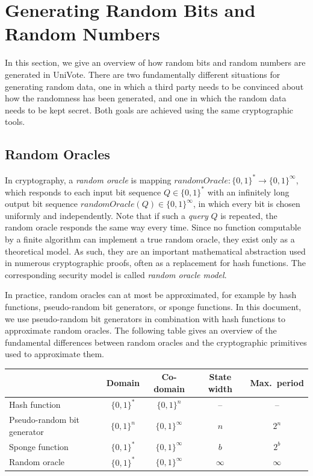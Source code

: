 \documentclass[bibtotoc,halfparskip,oneside]{scrreprt}
\begin{document}
	\section{Generating Random Bits and Random Numbers} 
	
	In this section, we give an overview of how random bits and random numbers are generated in UniVote. There are two fundamentally different situations for generating random data, one in which a third party needs to be convinced about how the randomness has been generated, and one in which the random data needs to be kept secret. Both goals are achieved using the same cryptographic tools.
	
	\subsection{Random Oracles}
	
	In cryptography, a \emph{random oracle} is mapping $\mathit{randomOracle}:\{0,1\}^*\rightarrow \{0,1\}^\infty$, which responds to each input bit sequence $Q\in \{0,1\}^*$ with an infinitely long  output bit sequence $\mathit{randomOracle}(Q)\in\{0,1\}^{\infty}$, in which every bit is chosen uniformly and independently. Note that if such a \emph{query} $Q$ is repeated, the random oracle responds the same way every time. Since no function computable by a finite algorithm can implement a true random oracle, they exist only as a theoretical model. As such, they are an important mathematical abstraction used in numerous cryptographic proofs, often as a replacement for hash functions. The corresponding security model is called \emph{random oracle model}.
	
	In practice, random oracles can at most be approximated, for example by hash functions, pseudo-random bit generators, or sponge functions. In this document, we use pseudo-random bit generators in combination with hash functions to approximate random oracles. The following table gives an overview of the fundamental differences between random oracles and the cryptographic primitives used to approximate them. 
	
	\begin{center}
		\begin{tabular}{l|c|c|c|c}
			& Domain & Co-domain & State width & Max.\ period \\\hline
			Hash function & $\{0,1\}^*$ & $\{0,1\}^n$ & -- & -- \\
			Pseudo-random bit generator & $\{0,1\}^n$ & $\{0,1\}^\infty$ & $n$ &$2^n$ \\
			Sponge function & $\{0,1\}^*$ & $\{0,1\}^\infty$ & $b$ & $2^b$\\\hline
			Random oracle & $\{0,1\}^*$ & $\{0,1\}^\infty$ & $\infty$ & $\infty$ \\
		\end{tabular}
	\end{center}
	
\end{document}

